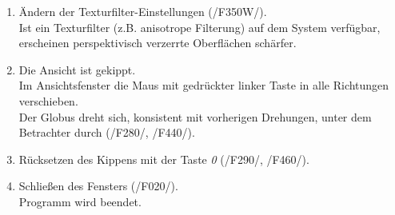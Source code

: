 \documentclass[10pt]{scrreprt}
\newcommand{\ziel}[1]{{\fontsize{9.5}{11}\textsf{/#1/}}}
\newcommand{\ziellabel}{Z}
\newcommand{\muss}{\renewcommand{\labelenumi}{\textbf{\ziel{\ziellabel\numprint{\theenumi}0}}}}
\begin{document}
\begin{enumerate}[leftmargin = 2.2cm, resume]
\item Ändern der Texturfilter-Einstellungen (\ziel{F350W}).\\Ist ein Texturfilter (z.B. anisotrope Filterung) auf dem System verfügbar, erscheinen perspektivisch verzerrte Oberflächen schärfer.
\muss
\item Die Ansicht ist gekippt.\\Im Ansichtsfenster die Maus mit gedrückter linker Taste in alle Richtungen verschieben.\\Der Globus dreht sich, konsistent mit vorherigen Drehungen, unter dem Betrachter durch (\ziel{F280}, \ziel{F440}).
\item Rücksetzen des Kippens mit der Taste \textit{0} (\ziel{F290}, \ziel{F460}).
\item Schließen des Fensters (\ziel{F020}).\\Programm wird beendet.
\end{enumerate}
\end{document}
